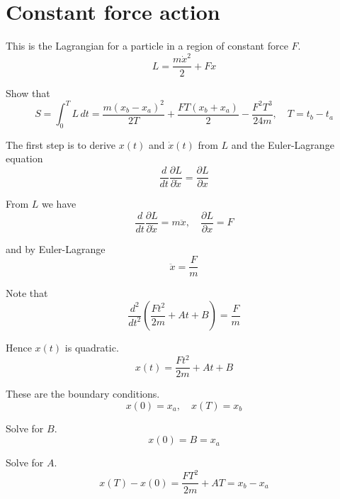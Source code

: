 

\section*{Constant force action}

This is the Lagrangian for a particle in a region of constant force $F$.
\begin{equation*}
L=\frac{m\dot x^2}{2}+Fx
\end{equation*}

Show that
\begin{equation*}
S=\int_0^TL\,dt=\frac{m(x_b-x_a)^2}{2T}+\frac{FT(x_b+x_a)}{2}-\frac{F^2T^3}{24m},\quad T=t_b-t_a
\end{equation*}

The first step is to derive $x(t)$ and $\dot x(t)$ from $L$ and the Euler-Lagrange equation
\begin{equation*}
\frac{d}{dt}\frac{\partial L}{\partial\dot x}=\frac{\partial L}{\partial x}
\end{equation*}

From $L$ we have
\begin{equation*}
\frac{d}{dt}\frac{\partial L}{\partial\dot x}=m\ddot x,\quad
\frac{\partial L}{\partial x}=F
\end{equation*}

and by Euler-Lagrange
\begin{equation*}
\ddot x=\frac{F}{m}
\end{equation*}

Note that
\begin{equation*}
\frac{d^2}{dt^2}\left(\frac{Ft^2}{2m}+At+B\right)=\frac{F}{m}
\end{equation*}

Hence $x(t)$ is quadratic.
\begin{equation*}
x(t)=\frac{Ft^2}{2m}+At+B
\end{equation*}

These are the boundary conditions.
\begin{equation*}
x(0)=x_a,\quad x(T)=x_b
\end{equation*}

Solve for $B$.
\begin{equation*}
x(0)=B=x_a
\end{equation*}

Solve for $A$.
\begin{equation*}
x(T)-x(0)=\frac{FT^2}{2m}+AT=x_b-x_a
\end{equation*}

